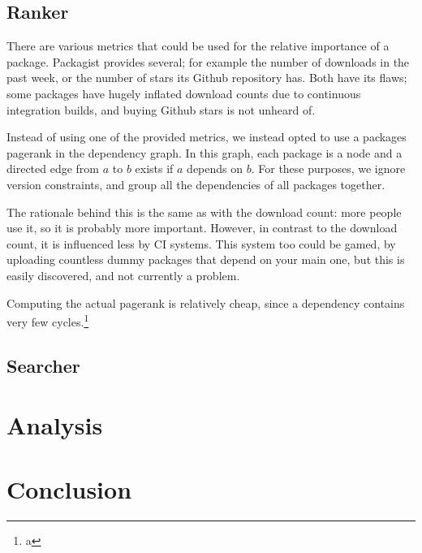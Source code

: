 \documentclass{article}
\begin{document}
\subsection{Ranker}

There are various metrics that could be used for the relative importance of a package. Packagist provides several; for example the number of downloads in the past week, or the number of stars its Github repository has. Both have its flaws; some packages have hugely inflated download counts due to continuous integration builds, and buying Github stars is not unheard of. %

Instead of using one of the provided metrics, we instead opted to use a packages pagerank %
in the dependency graph. In this graph, each package is a node and a directed edge from $a$ to $b$ exists if $a$ depends on $b$. For these purposes, we ignore version constraints, and group all the dependencies of all packages together.

The rationale behind this is the same as with the download count: more people use it, so it is probably more important. However, in contrast to the download count, it is influenced less by CI systems. This system too could be gamed, by uploading countless dummy packages that depend on your main one, but this is easily discovered, and not currently a problem.

Computing the actual pagerank is relatively cheap, since a dependency contains very few cycles.\footnote{a}



\subsection{Searcher}

\section{Analysis}

\section{Conclusion}
\end{document}

